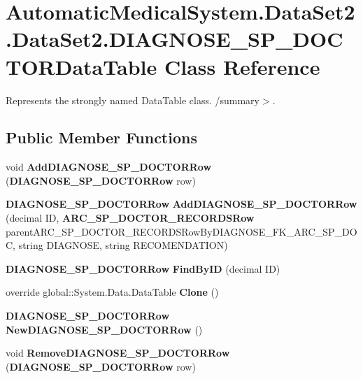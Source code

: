 \section{AutomaticMedicalSystem.DataSet2.DataSet2.DIAGNOSE\_\-SP\_\-DOCTORDataTable Class Reference}
\label{class_automatic_medical_system_1_1_data_set2_1_1_d_i_a_g_n_o_s_e___s_p___d_o_c_t_o_r_data_table}
Represents the strongly named DataTable class. /summary$>$.  


\subsection*{Public Member Functions}
\begin{CompactItemize}
\item 
void \textbf{AddDIAGNOSE\_\-SP\_\-DOCTORRow} ({\bf DIAGNOSE\_\-SP\_\-DOCTORRow} row)\label{class_automatic_medical_system_1_1_data_set2_1_1_d_i_a_g_n_o_s_e___s_p___d_o_c_t_o_r_data_table_b74ee10d16ac5ec281fef151eef4f9d7}

\item 
{\bf DIAGNOSE\_\-SP\_\-DOCTORRow} \textbf{AddDIAGNOSE\_\-SP\_\-DOCTORRow} (decimal ID, {\bf ARC\_\-SP\_\-DOCTOR\_\-RECORDSRow} parentARC\_\-SP\_\-DOCTOR\_\-RECORDSRowByDIAGNOSE\_\-FK\_\-ARC\_\-SP\_\-DOC, string DIAGNOSE, string RECOMENDATION)\label{class_automatic_medical_system_1_1_data_set2_1_1_d_i_a_g_n_o_s_e___s_p___d_o_c_t_o_r_data_table_d88ad81ee191a2e1b59ef70b6769a75f}

\item 
{\bf DIAGNOSE\_\-SP\_\-DOCTORRow} \textbf{FindByID} (decimal ID)\label{class_automatic_medical_system_1_1_data_set2_1_1_d_i_a_g_n_o_s_e___s_p___d_o_c_t_o_r_data_table_a83742bb80307e8a127bb21608d717c7}

\item 
override global::System.Data.DataTable \textbf{Clone} ()\label{class_automatic_medical_system_1_1_data_set2_1_1_d_i_a_g_n_o_s_e___s_p___d_o_c_t_o_r_data_table_8b7ac17accf2c857b59f69ec199dc5fc}

\item 
{\bf DIAGNOSE\_\-SP\_\-DOCTORRow} \textbf{NewDIAGNOSE\_\-SP\_\-DOCTORRow} ()\label{class_automatic_medical_system_1_1_data_set2_1_1_d_i_a_g_n_o_s_e___s_p___d_o_c_t_o_r_data_table_148a709b11c66b128a9172c1c1f3f5bb}

\item 
void \textbf{RemoveDIAGNOSE\_\-SP\_\-DOCTORRow} ({\bf DIAGNOSE\_\-SP\_\-DOCTORRow} row)\label{class_automatic_medical_system_1_1_data_set2_1_1_d_i_a_g_n_o_s_e___s_p___d_o_c_t_o_r_data_table_597f70856a28241dcc1b5bcac954ae52}

\end{CompactItemize}
